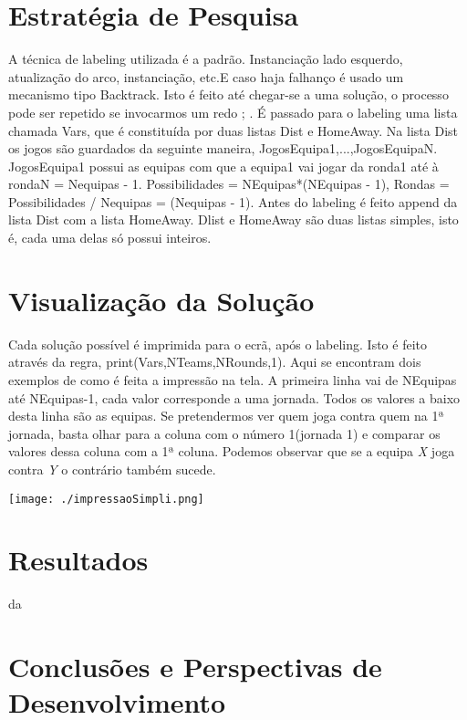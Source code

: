 \documentclass[runningheads,a4paper]{llncs}
\begin{document}
\section{Estratégia de Pesquisa}
A técnica de labeling utilizada é a padrão. Instanciação lado esquerdo, atualização do arco, instanciação, etc.E caso haja falhanço é usado um mecanismo tipo Backtrack. Isto é feito até chegar-se a uma solução, o processo pode ser repetido se invocarmos um redo ; . É passado para o labeling uma lista chamada Vars, que é constituída por duas listas Dist e HomeAway. Na lista Dist os jogos são guardados da seguinte maneira, \lbrack JogosEquipa1,...,JogosEquipaN\rbrack. JogosEquipa1 possui as equipas com que a equipa1 vai jogar da ronda1 até à rondaN = Nequipas - 1. Possibilidades = NEquipas*(NEquipas - 1), Rondas = Possibilidades / Nequipas = (Nequipas - 1). Antes do labeling é feito append da lista Dist com a lista HomeAway. Dlist e HomeAway são duas listas simples, isto é, cada uma delas só possui inteiros.

\section{Visualização da Solução}
Cada solução possível é imprimida para o ecrã, após o labeling. Isto é feito através da regra, print(Vars,NTeams,NRounds,1). Aqui se encontram dois exemplos de como é feita a impressão na tela. A primeira linha vai de NEquipas até NEquipas-1, cada valor corresponde a uma jornada. Todos os valores a baixo desta linha são as equipas. Se pretendermos ver quem joga contra quem na 1ª jornada, basta olhar para a coluna com o número 1(jornada 1) e comparar os valores dessa coluna com a 1ª coluna. Podemos observar que se a equipa \textit{X} joga contra \textit{Y} o contrário também sucede.

\begin{center}
\texttt{[image: ./impressaoSimpli.png]}
\end{center}

\section{Resultados}
da

\section{Conclusões e Perspectivas de Desenvolvimento}
\end{document}
